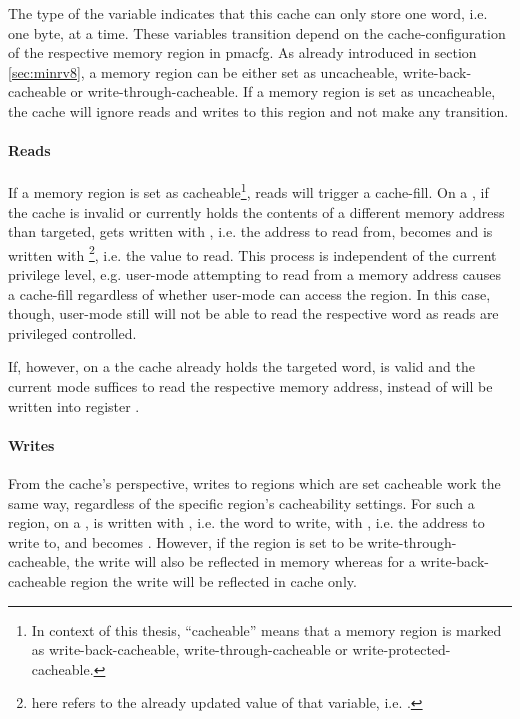 The type of the  variable indicates that this cache can only store one word, i.e. one byte, at a time.
These variables transition depend on the cache-configuration of the respective memory region in \gls{pmacfg}.
As already introduced in section \ref{sec:minrv8}, a memory region can be either set as uncacheable, write-back-cacheable or write-through-cacheable.
If a memory region is set as uncacheable, the cache will ignore reads and writes to this region and not make any transition.

\paragraph{Reads}
If a memory region is set as cacheable\footnote{%
    In context of this thesis, \enquote{cacheable} means that a memory region is marked as write-back-cacheable, write-through-cacheable or write-protected-cacheable.
}, reads will trigger a cache-fill.
On a , if the cache is invalid or currently holds the contents of a different memory address than targeted,  gets written with , i.e. the address to read from,  becomes  and  is written with \footnote{%
     here refers to the already updated value of that variable, i.e. .
}, i.e. the value to read.
This process is independent of the current privilege level, e.g. user-mode attempting to read from a memory address causes a cache-fill regardless of whether user-mode can access the region.
In this case, though, user-mode still will not be able to read the respective word as reads are privileged controlled.

If, however, on a  the cache already holds the targeted word, is valid and the current mode suffices to read the respective memory address,  instead of  will be written into register .

\paragraph{Writes}
From the cache's perspective, writes to regions which are set cacheable work the same way, regardless of the specific region's cacheability settings.
For such a region, on a ,  is written with , i.e. the word to write,  with , i.e. the address to write to, and  becomes .
However, if the region is set to be write-through-cacheable, the write will also be reflected in memory whereas for a write-back-cacheable region the write will be reflected in cache only.

